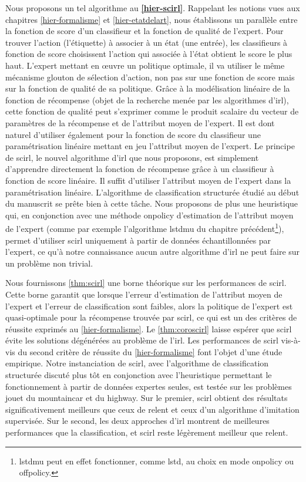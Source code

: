 \documentclass[frenchb,a4paper,justified,notoc]{tufte-book}
\begin{document}
Nous proposons un tel algorithme au \textbf{\autoref{hier-scirl}}. Rappelant les notions vues aux chapitres \ref{hier-formalisme} et \ref{hier-etatdelart}, nous établissons un parallèle entre la fonction de score d'un classifieur et la fonction de qualité de l'expert. Pour trouver l'action (l'étiquette) à associer à un état (une entrée), les classifieurs à fonction de score choisissent l'action qui associée à l'état obtient le score le plus haut. L'expert mettant en œuvre un politique optimale, il va utiliser le même mécanisme glouton de sélection d'action, non pas sur une fonction de score mais sur la fonction de qualité de sa politique. Grâce à la modélisation linéaire de la fonction de récompense (objet de la recherche menée par les algorithmes d'\gls{irl}), cette fonction de qualité peut s'exprimer comme le produit scalaire du vecteur de paramètres de la récompense et de l'attribut moyen de l'expert. Il est dont naturel d'utiliser également pour la fonction de score du classifieur une paramétrisation linéaire mettant en jeu l'attribut moyen de l'expert. Le principe de \gls{scirl}, le nouvel algorithme d'\gls{irl} que nous proposons, est simplement d'apprendre directement la fonction de récompense grâce à un classifieur à fonction de score linéaire. Il suffit d'utiliser l'attribut moyen de l'expert dans la paramétrisation linéaire. L'algorithme de classification structurée étudié au début du manuscrit se prête bien à cette tâche. Nous proposons de plus une heuristique qui, en conjonction avec une méthode \gls{onpolicy} d'estimation de l'attribut moyen de l'expert (comme par exemple l'algorithme \gls{lstdmu} du chapitre précédent\footnote{\gls{lstdmu} peut en effet fonctionner, comme \gls{lstd}, au choix en mode \gls{onpolicy} ou \gls{offpolicy}.
 }), permet d'utiliser \gls{scirl} uniquement à partir de données échantillonnées par l'expert, ce qu'à notre connaissance aucun autre algorithme d'\gls{irl} ne peut faire sur un problème non trivial.

Nous fournissons \autoref{thm:scirl} une borne théorique sur les performances de \gls{scirl}. Cette borne garantit que lorsque l'erreur d'estimation de l'attribut moyen de l'expert et l'erreur de classification sont faibles, alors la politique de l'expert est quasi-optimale pour la récompense trouvée par \gls{scirl}, ce qui est un des critères de réussite exprimés au \autoref{hier-formalisme}. Le \autoref{thm:coroscirl} laisse espérer que \gls{scirl} évite les solutions dégénérées au problème de l'\gls{irl}. Les performances de \gls{scirl} vis-à-vis du second critère de réussite du \autoref{hier-formalisme} font l'objet d'une étude empirique. Notre instanciation de \gls{scirl}, avec l'algorithme de classification structurée discuté plus tôt en conjonction avec l'heuristique permettant le fonctionnement à partir de données expertes seules, est testée sur les problèmes jouet du \gls{mountaincar} et du \gls{highway}. Sur le premier, \gls{scirl} obtient des résultats significativement meilleurs que ceux de \gls{relent} et ceux d'un algorithme d'imitation supervisée. Sur le second, les deux approches d'\gls{irl} montrent de meilleures performances que la classification, et \gls{scirl} reste légèrement meilleur que \gls{relent}.
\end{document}
